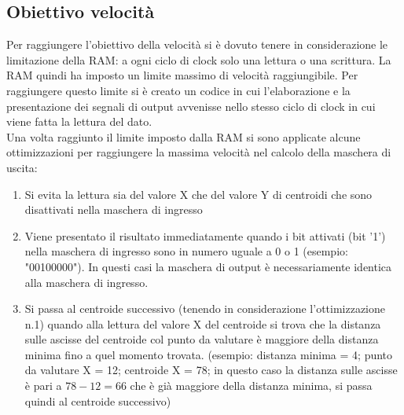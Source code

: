 \documentclass{article}
\begin{document}
\subsection{Obiettivo velocità} \label{subsection-ob-vel}
Per raggiungere l'obiettivo della velocità si è dovuto tenere in considerazione le limitazione della RAM: a ogni ciclo di clock solo una lettura o una scrittura. La RAM quindi ha imposto un limite massimo di velocità raggiungibile. Per raggiungere questo limite si è creato un codice in cui l'elaborazione e la presentazione dei segnali di output avvenisse nello stesso ciclo di clock in cui viene fatta la lettura del dato.\\
Una volta raggiunto il limite imposto dalla RAM si sono applicate alcune ottimizzazioni per raggiungere la massima velocità nel calcolo della maschera di uscita:
\begin{enumerate}
    \item Si evita la lettura sia del valore X che del valore Y di centroidi che sono disattivati nella maschera di ingresso
    \item Viene presentato il risultato immediatamente quando i bit attivati (bit '1') nella maschera di ingresso sono in numero uguale a 0 o 1 (esempio: "00100000"). In questi casi la maschera di output è necessariamente identica alla maschera di ingresso.
    \item Si passa al centroide successivo (tenendo in considerazione l'ottimizzazione n.1) quando alla lettura del valore X del centroide si trova che la distanza sulle ascisse del centroide col punto da valutare è maggiore della distanza minima fino a quel momento trovata. (esempio: distanza minima = 4; punto da valutare X = 12; centroide X = 78; in questo caso la distanza sulle ascisse è pari a \(78-12=66\) che è già maggiore della distanza minima, si passa quindi al centroide successivo)
\end{enumerate}
\end{document}
